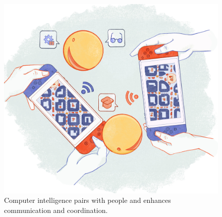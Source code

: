 \setcounter{figure}{-1}
\begin{figure}[htbp!]
    \centering
    \includegraphics[width=1\textwidth]{chapters/02_getting_real/figures/fig_03_computer_intelligence.jpg}
    \captionsetup{format=plain, justification=centering} %
    \caption{Computer intelligence pairs with people and enhances communication and coordination.}
   \label{fig:hybrid_intelligence}
\end{figure}
\FloatBarrier

